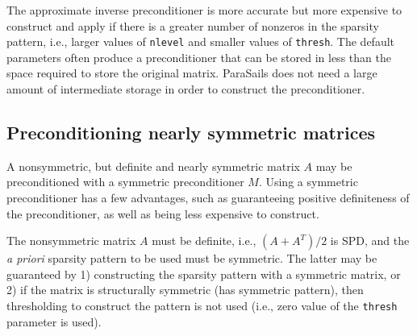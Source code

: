 The approximate inverse preconditioner is more accurate but more expensive
to construct and apply if there is a greater number of nonzeros in the
sparsity pattern, i.e., larger
values of {\tt nlevel} and smaller values of {\tt thresh}.  The default
parameters often produce a preconditioner that can be stored in less than
the space required to store the original matrix.
ParaSails does not need a large amount of intermediate storage in
order to construct the preconditioner.

\subsection{Preconditioning nearly symmetric matrices}
\label{nearly}
A nonsymmetric, but definite and nearly symmetric matrix $A$ 
may be preconditioned
with a symmetric preconditioner $M$.  Using a symmetric preconditioner
has a few advantages, such as guaranteeing positive
definiteness of the preconditioner, as well as being less expensive
to construct.

The nonsymmetric matrix $A$ must be definite,
i.e., $(A+A^T)/2$ is SPD, and the {\em a priori} sparsity pattern to be used
must be symmetric.  The latter may be guaranteed by 1) 
constructing the sparsity pattern with a symmetric matrix, or 2) if the
matrix is structurally symmetric (has symmetric pattern), then
thresholding to construct the pattern is not used (i.e.,
zero value of the {\tt thresh} parameter is used).

